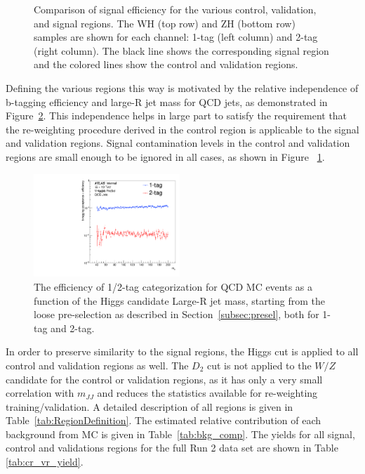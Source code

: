 \begin{figure}[htbp!]
\begin{center}
\end{center}
\caption{
    Comparison of signal efficiency for the various control, validation, and signal regions. The WH (top row) and ZH (bottom row) samples are shown for each channel: 1-tag (left column) and 2-tag (right column).
    The black line shows the corresponding signal region and the colored lines show the control and validation regions.
}
\label{fig:sig_contam}
\end{figure}

Defining the various regions this way is motivated by the relative independence of b-tagging efficiency and large-R jet mass for QCD jets, as demonstrated in Figure~\ref{fig:bkg_btag_eff}.
This independence helps in large part to satisfy the requirement that the re-weighting procedure derived in the control region is applicable to the signal and validation regions.
Signal contamination levels in the control and validation regions are small enough to be ignored in all cases, as shown in Figure ~\ref{fig:sig_contam}. 

\begin{figure}[htbp!]
\begin{center}
    \includegraphics[width=0.49\textwidth]{PlotBtagRej_mH.pdf}
\end{center}
\caption{The efficiency of 1/2-tag categorization for QCD MC events as a function of the Higgs candidate Large-R jet mass, starting from the loose pre-selection as described in Section~\ref{subsec:presel}, both for 1-tag and 2-tag. }
\label{fig:bkg_btag_eff}
\end{figure}

In order to preserve similarity to the signal regions, the Higgs \ntrk cut is applied to all control and validation regions as well.
The $D_2$ cut is not applied to the $W/Z$ candidate for the control or validation regions, as it has only a very small correlation with $m_{JJ}$ and reduces the statistics available for re-weighting training/validation.
A detailed description of all regions is given in Table~\ref{tab:RegionDefinition}.
The estimated relative contribution of each background from MC is given in Table~\ref{tab:bkg_comp}.
The yields for all signal, control and validations regions for the full Run 2 data set are shown in Table \ref{tab:cr_vr_yield}.


